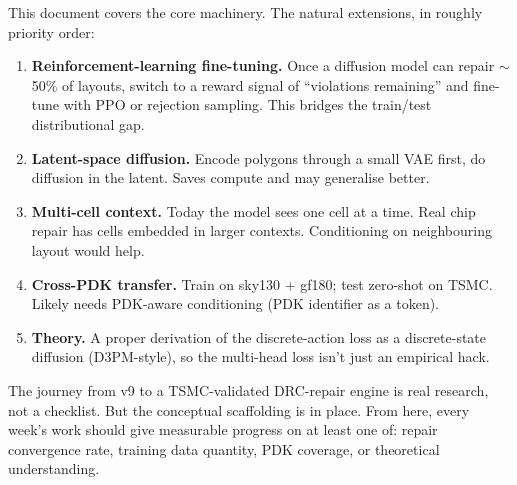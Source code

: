 \documentclass[11pt,a4paper]{article}
\begin{document}
This document covers the core machinery. The natural extensions, in
roughly priority order:

\begin{enumerate}[leftmargin=*]
\item \textbf{Reinforcement-learning fine-tuning.} Once a diffusion
  model can repair $\sim$50\% of layouts, switch to a reward signal of
  ``violations remaining'' and fine-tune with PPO or rejection
  sampling. This bridges the train/test distributional gap.
\item \textbf{Latent-space diffusion.} Encode polygons through a small
  VAE first, do diffusion in the latent. Saves compute and may
  generalise better.
\item \textbf{Multi-cell context.} Today the model sees one cell at a
  time. Real chip repair has cells embedded in larger contexts.
  Conditioning on neighbouring layout would help.
\item \textbf{Cross-PDK transfer.} Train on sky130 + gf180; test
  zero-shot on TSMC. Likely needs PDK-aware conditioning (PDK
  identifier as a token).
\item \textbf{Theory.} A proper derivation of the discrete-action loss
  as a discrete-state diffusion (D3PM-style), so the multi-head loss
  isn't just an empirical hack.
\end{enumerate}

The journey from v9 to a TSMC-validated DRC-repair engine is real
research, not a checklist. But the conceptual scaffolding is in
place. From here, every week's work should give measurable progress
on at least one of: repair convergence rate, training data quantity,
PDK coverage, or theoretical understanding.
\end{document}
